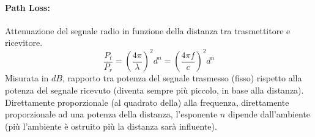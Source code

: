\paragraph{Path Loss:} Attenuazione del segnale radio in funzione della distanza tra trasmettitore e ricevitore.
$$ \frac{P_t}{P_r} = \left(\frac{4 \pi}{\lambda}\right)^2 d^n = \left(\frac{4 \pi f}{c}\right)^2 d^n $$
Misurata in $dB$, rapporto tra potenza del segnale trasmesso (fisso) rispetto alla potenza del segnale ricevuto (diventa sempre più piccolo, in base alla distanza).\\

Direttamente proporzionale (al quadrato della) alla frequenza, direttamente proporzionale ad una potenza della distanza, l'esponente $n$ dipende dall'ambiente (più l'ambiente è ostruito più la distanza sarà influente).\\

